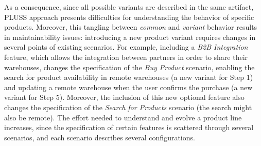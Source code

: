 \documentclass{acm_proc_article-sp}
\begin{document}
As a consequence, since all possible variants are described in the same
artifact, PLUSS approach presents difficulties for understanding the behavior
of specific products.
Moreover, this tangling between \emph{common} and
\emph{variant} behavior results in maintainability issues: introducing a new product variant
requires changes in several points of existing scenarios. For example, including a
\emph{B2B Integration} feature, which allows the integration between partners in
order to share their warehouses, changes the specification of the \emph{Buy
Product} scenario, enabling the search for product availability in remote
warehouses (a new variant for Step 1) and updating a remote warehouse when the
user confirms the purchase (a new variant for Step 5). Moreover, the inclusion of
this new optional feature also changes the specification of the \emph{Search for
Products} scenario (the search might also be remote). The effort
needed to understand and evolve a product line increases, since the
specification of certain features is scattered through several scenarios,
and each scenario describes several configurations.

\end{document}
